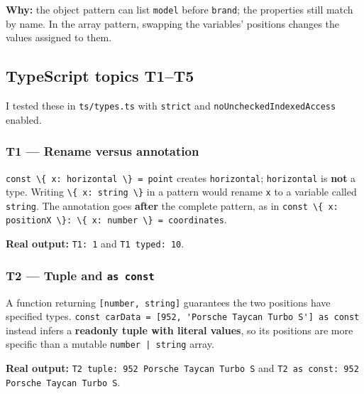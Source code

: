 \documentclass[
  9pt,
]{article}
\newcommand{\passthrough}[1]{#1}
\begin{document}
\textbf{Why:} the object pattern can list
\passthrough{\lstinline!model!} before \passthrough{\lstinline!brand!};
the properties still match by name. In the array pattern, swapping the
variables' positions changes the values assigned to them.

\subsection{TypeScript topics T1--T5}\label{typescript-topics-t1t5}

I tested these in \passthrough{\lstinline!ts/types.ts!} with
\passthrough{\lstinline!strict!} and
\passthrough{\lstinline!noUncheckedIndexedAccess!} enabled.

\subsubsection{T1 --- Rename versus
annotation}\label{t1-rename-versus-annotation}

\passthrough{\lstinline!const \{ x: horizontal \} = point!} creates
\passthrough{\lstinline!horizontal!};
\passthrough{\lstinline!horizontal!} is \textbf{not} a type. Writing
\passthrough{\lstinline!\{ x: string \}!} in a pattern would rename
\passthrough{\lstinline!x!} to a variable called
\passthrough{\lstinline!string!}. The annotation goes \textbf{after} the
complete pattern, as in
\passthrough{\lstinline!const \{ x: positionX \}: \{ x: number \} = coordinates!}.

\textbf{Real output:} \passthrough{\lstinline!T1: 1!} and
\passthrough{\lstinline!T1 typed: 10!}.

\subsubsection{\texorpdfstring{T2 --- Tuple and
\texttt{as\ const}}{T2 --- Tuple and as const}}\label{t2-tuple-and-as-const}

A function returning \passthrough{\lstinline![number, string]!}
guarantees the two positions have specified types.
\passthrough{\lstinline!const carData = [952, 'Porsche Taycan Turbo S'] as const!}
instead infers a \textbf{readonly tuple with literal values}, so its
positions are more specific than a mutable
\passthrough{\lstinline!number | string!} array.

\textbf{Real output:}
\passthrough{\lstinline!T2 tuple: 952 Porsche Taycan Turbo S!} and
\passthrough{\lstinline!T2 as const: 952 Porsche Taycan Turbo S!}.
\end{document}
